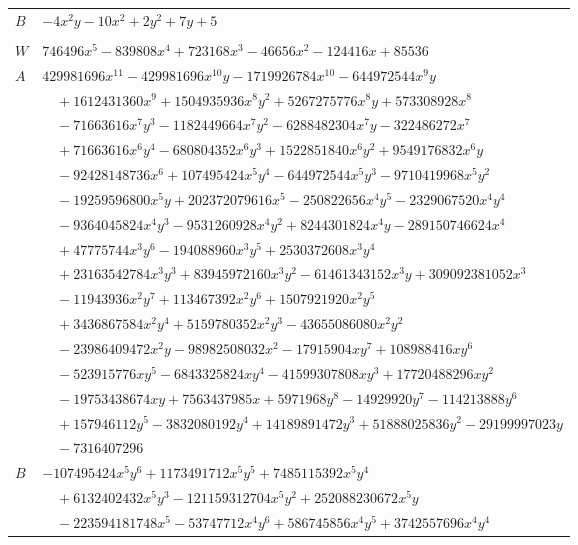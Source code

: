 \documentclass[11pt]{article}
\begin{document}
\begin{longtable}{@{}ll@{}}
$B$ & $-4x^{2}y-10x^{2}+2y^{2}+7y+5$\\
\addlinespace[3pt]
\multicolumn{2}{@{}l}{$i=29$, $m=10368$, neighbours $114,5,31,39,50,55,65,78,83$}\\
$W$ & $746496x^{5}-839808x^{4}+723168x^{3}-46656x^{2}-124416x+85536$\\
$A$ & $429981696x^{11}-429981696x^{10}y-1719926784x^{10}-644972544x^{9}y$\\
 & $\quad +1612431360x^{9}+1504935936x^{8}y^{2}+5267275776x^{8}y+573308928x^{8}$\\
 & $\quad -71663616x^{7}y^{3}-1182449664x^{7}y^{2}-6288482304x^{7}y-322486272x^{7}$\\
 & $\quad +71663616x^{6}y^{4}-680804352x^{6}y^{3}+1522851840x^{6}y^{2}+9549176832x^{6}y$\\
 & $\quad -92428148736x^{6}+107495424x^{5}y^{4}-644972544x^{5}y^{3}-9710419968x^{5}y^{2}$\\
 & $\quad -19259596800x^{5}y+202372079616x^{5}-250822656x^{4}y^{5}-2329067520x^{4}y^{4}$\\
 & $\quad -9364045824x^{4}y^{3}-9531260928x^{4}y^{2}+8244301824x^{4}y-289150746624x^{4}$\\
 & $\quad +47775744x^{3}y^{6}-194088960x^{3}y^{5}+2530372608x^{3}y^{4}$\\
 & $\quad +23163542784x^{3}y^{3}+83945972160x^{3}y^{2}-61461343152x^{3}y+309092381052x^{3}$\\
 & $\quad -11943936x^{2}y^{7}+113467392x^{2}y^{6}+1507921920x^{2}y^{5}$\\
 & $\quad +3436867584x^{2}y^{4}+5159780352x^{2}y^{3}-43655086080x^{2}y^{2}$\\
 & $\quad -23986409472x^{2}y-98982508032x^{2}-17915904xy^{7}+108988416xy^{6}$\\
 & $\quad -523915776xy^{5}-6843325824xy^{4}-41599307808xy^{3}+17720488296xy^{2}$\\
 & $\quad -19753438674xy+7563437985x+5971968y^{8}-14929920y^{7}-114213888y^{6}$\\
 & $\quad +157946112y^{5}-3832080192y^{4}+14189891472y^{3}+51888025836y^{2}-29199997023y$\\
 & $\quad -7316407296$\\
$B$ & $-107495424x^{5}y^{6}+1173491712x^{5}y^{5}+7485115392x^{5}y^{4}$\\
 & $\quad +6132402432x^{5}y^{3}-121159312704x^{5}y^{2}+252088230672x^{5}y$\\
 & $\quad -223594181748x^{5}-53747712x^{4}y^{6}+586745856x^{4}y^{5}+3742557696x^{4}y^{4}$\\

\end{longtable}
\end{document}
